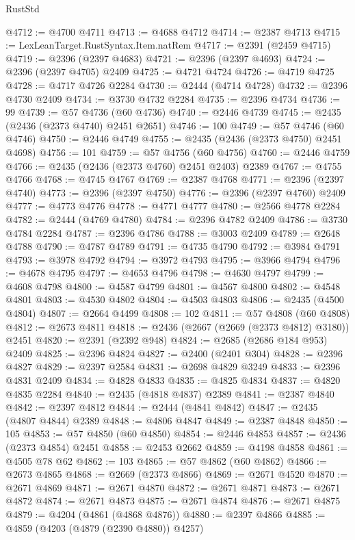 \begin{lexlean}{RustStd}
\begin{coremodule}
@4712 := @4700 @4711
@4713 := @4688 @4712
@4714 := @2387 @4713
@4715 := LexLeanTarget.RustSyntax.Item.natRem
@4717 := @2391 (@2459 @4715)
@4719 := @2396 (@2397 @4683)
@4721 := @2396 (@2397 @4693)
@4724 := @2396 (@2397 @4705) @2409
@4725 := @4721 @4724
@4726 := @4719 @4725
@4728 := @4717 @4726 @2284
@4730 := @2444 (@4714 @4728)
@4732 := @2396 @4730 @2409
@4734 := @3730 @4732 @2284
@4735 := @2396 @4734
@4736 := 99
@4739 := @57 @4736 (@60 @4736)
@4740 := @2446 @4739
@4745 := @2435 (@2436 (@2373 @4740) @2451 @2651)
@4746 := 100
@4749 := @57 @4746 (@60 @4746)
@4750 := @2446 @4749
@4755 := @2435 (@2436 (@2373 @4750) @2451 @4698)
@4756 := 101
@4759 := @57 @4756 (@60 @4756)
@4760 := @2446 @4759
@4766 := @2435 (@2436 (@2373 @4760) @2451 @2403) @2389
@4767 := @4755 @4766
@4768 := @4745 @4767
@4769 := @2387 @4768
@4771 := @2396 (@2397 @4740)
@4773 := @2396 (@2397 @4750)
@4776 := @2396 (@2397 @4760) @2409
@4777 := @4773 @4776
@4778 := @4771 @4777
@4780 := @2566 @4778 @2284
@4782 := @2444 (@4769 @4780)
@4784 := @2396 @4782 @2409
@4786 := @3730 @4784 @2284
@4787 := @2396 @4786
@4788 := @3003 @2409
@4789 := @2648 @4788
@4790 := @4787 @4789
@4791 := @4735 @4790
@4792 := @3984 @4791
@4793 := @3978 @4792
@4794 := @3972 @4793
@4795 := @3966 @4794
@4796 := @4678 @4795
@4797 := @4653 @4796
@4798 := @4630 @4797
@4799 := @4608 @4798
@4800 := @4587 @4799
@4801 := @4567 @4800
@4802 := @4548 @4801
@4803 := @4530 @4802
@4804 := @4503 @4803
@4806 := @2435 (@4500 @4804)
@4807 := @2664 @4499
@4808 := 102
@4811 := @57 @4808 (@60 @4808)
@4812 := @2673 @4811
@4818 := @2436 (@2667 (@2669 (@2373 @4812) @3180)) @2451
@4820 := @2391 (@2392 @948)
@4824 := @2685 (@2686 @184 @953) @2409
@4825 := @2396 @4824
@4827 := @2400 (@2401 @304)
@4828 := @2396 @4827
@4829 := @2397 @2584
@4831 := @2698 @4829 @3249
@4833 := @2396 @4831 @2409
@4834 := @4828 @4833
@4835 := @4825 @4834
@4837 := @4820 @4835 @2284
@4840 := @2435 (@4818 @4837) @2389
@4841 := @2387 @4840
@4842 := @2397 @4812
@4844 := @2444 (@4841 @4842)
@4847 := @2435 (@4807 @4844) @2389
@4848 := @4806 @4847
@4849 := @2387 @4848
@4850 := 105
@4853 := @57 @4850 (@60 @4850)
@4854 := @2446 @4853
@4857 := @2436 (@2373 @4854) @2451
@4858 := @2453 @2662
@4859 := @4198 @4858
@4861 := @4505 @78 @62
@4862 := 103
@4865 := @57 @4862 (@60 @4862)
@4866 := @2673 @4865
@4868 := @2669 (@2373 @4866)
@4869 := @2671 @4520
@4870 := @2671 @4869
@4871 := @2671 @4870
@4872 := @2671 @4871
@4873 := @2671 @4872
@4874 := @2671 @4873
@4875 := @2671 @4874
@4876 := @2671 @4875
@4879 := @4204 (@4861 (@4868 @4876))
@4880 := @2397 @4866
@4885 := @4859 (@4203 (@4879 (@2390 @4880)) @4257)

\end{coremodule}
\end{lexlean}
